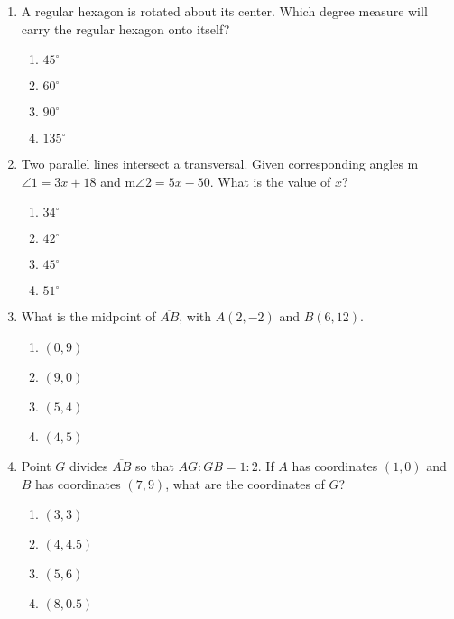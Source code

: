 \begin{enumerate}
\item A regular hexagon is rotated about its center. Which degree measure will carry the regular hexagon onto itself? 
\begin{multicols}{2}
\begin{enumerate}
  \item $45^\circ$
  \item $60^\circ$
  \item $90^\circ$
  \item $135^\circ$
\end{enumerate}
\end{multicols}

\item Two parallel lines intersect a transversal. Given corresponding angles  m$\angle 1 = 3x+18$ and m$\angle 2 = 5x-50$. What is the value of $x$?
\begin{multicols}{2}
  \begin{enumerate}
    \item $34^\circ$
    \item $42^\circ$
    \item $45^\circ$
    \item $51^\circ$
  \end{enumerate}
  \end{multicols}

\newpage
\item What is the midpoint of $\overline{AB}$, with $A(2,-2)$ and $B(6,12)$.
\begin{multicols}{2}
  \begin{enumerate}
    \item $(0,9)$
    \item $(9,0)$
    \item $(5,4)$
    \item $(4,5)$
  \end{enumerate}
  \end{multicols} \vspace{1cm}

\item Point $G$ divides $\overline{AB}$ so that $AG:GB = 1:2$. If $A$ has coordinates $(1,0)$ and $B$ has coordinates $(7,9)$, what are the coordinates of $G$?
\begin{multicols}{2}
  \begin{enumerate}
    \item $(3,3)$
    \item $(4,4.5)$
    \item $(5,6)$
    \item $(8,0.5)$
  \end{enumerate}
  \end{multicols} \vspace{2cm}


\end{enumerate}
